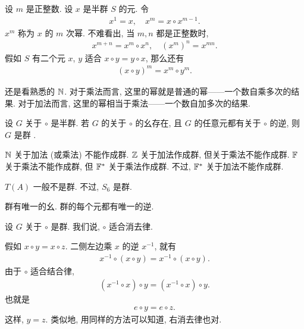 \begin{definition}
    设 $m$ 是正整数. 设 $x$ 是半群 $S$ 的元. 令
    \begin{align*}
        x^{1} = x, \quad x^{m} = x \circ x^{m-1}.
    \end{align*}
    $x^{m}$ 称为 $x$ 的 $m$ 次幂. 不难看出, 当 $m,n$ 都是正整数时,
    \begin{align*}
        x^{m+n} = x^m \circ x^n, \quad (x^m)^n = x^{mn}.
    \end{align*}
    假如 $S$ 有二个元 $x$, $y$ 适合 $x \circ y = y \circ x$, 那么还有
    \begin{align*}
        (x \circ y)^m = x^m \circ y^m.
    \end{align*}
\end{definition}

\begin{example}
    还是看熟悉的 $\mathbb{N}$. 对于乘法而言, 这里的幂就是普通的幂——一个数自乘多次的结果. 对于加法而言, 这里的幂相当于乘法——一个数自加多次的结果.
\end{example}

\begin{definition}
    设 $G$ 关于 $\circ$ 是半群. 若 $G$ 的关于 $\circ$ 的幺存在, 且 $G$ 的任意元都有关于 $\circ$ 的逆, 则 $G$ 是群 .
\end{definition}

\begin{example}
    $\mathbb{N}$ 关于加法 (或乘法) 不能作成群. $\mathbb{Z}$ 关于加法作成群, 但关于乘法不能作成群. $\mathbb{F}$ 关于乘法不能作成群, 但 $\mathbb{F}^{\ast}$ 关于乘法作成群. 不过, $\mathbb{F}^{\ast}$ 关于加法不能作成群.
\end{example}

\begin{example}
    $T(A)$ 一般不是群. 不过, $S_6$ 是群.
\end{example}

\begin{remark}
    群有唯一的幺. 群的每个元都有唯一的逆.
\end{remark}

\begin{remark}
    设 $G$ 关于 $\circ$ 是群. 我们说, $\circ$ 适合消去律.

    假如 $x \circ y = x \circ z$. 二侧左边乘 $x$ 的逆 $x^{-1}$, 就有
    \begin{align*}
        x^{-1} \circ (x \circ y) = x^{-1} \circ (x \circ y).
    \end{align*}
    由于 $\circ$ 适合结合律,
    \begin{align*}
        (x^{-1} \circ x) \circ y = (x^{-1} \circ x) \circ y.
    \end{align*}
    也就是
    \begin{align*}
        e \circ y = e \circ z.
    \end{align*}
    这样, $y = z$. 类似地, 用同样的方法可以知道, 右消去律也对.
\end{remark}

